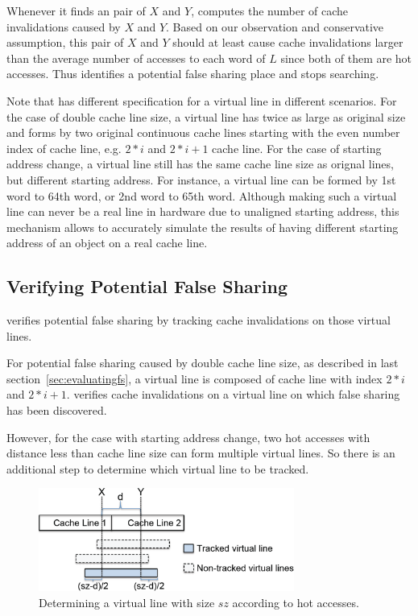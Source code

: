 Whenever it finds an pair of $X$ and $Y$, 
\Predator{} computes the number of cache invalidations caused by $X$ and $Y$.
Based on our observation and conservative assumption,
this pair of $X$ and $Y$ should at least cause cache invalidations 
larger than the average number of accesses to each word of $L$ since both of them 
are hot accesses.
Thus \Predator{} identifies a potential false sharing place and stops searching.

Note that \Predator{} has different specification for a virtual line in
different scenarios. 
For the case of double cache line size, a virtual line has twice
 as large as original size and forms by two original 
continuous cache lines starting with the even number index of cache line, 
e.g. $2*i$ and $2*i+1$ cache line.
For the case of starting address change,
a virtual line still has the same cache line size as orignal lines, but
different starting address.
For instance, a virtual line can be formed by 1st word to 64th word, or 2nd word to 65th word.
Although making such a virtual line can never be a real line in hardware due to unaligned starting
address, this mechanism allows to accurately simulate the results of having different starting address of an
object on a real cache line.


\subsection{Verifying Potential False Sharing}
\label{sec:tracking}

\Predator{} verifies potential false sharing by tracking 
cache invalidations on those virtual lines. 

For potential false sharing caused by double cache line size, as described in
last section~\ref{sec:evaluatingfs}, a virtual line is composed of 
cache line with index $2*i$ and $2*i+1$. \Predator{} verifies cache invalidations
on a virtual line on which false sharing has been discovered.

However, for the case with starting address change, 
two hot accesses with distance less than cache line size 
can form multiple virtual lines. 
So there is an additional step to determine which virtual line to be tracked.

\begin{figure}
\begin{center} 
\includegraphics[width=3.3in]{fig/trackpotential}
\end{center}
\caption{Determining a virtual line with size $sz$ according to hot accesses.}
\label{fig:trackpotential}
\end{figure}

